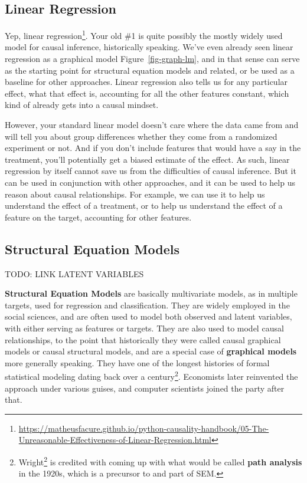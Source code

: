 \documentclass[
  letterpaper,
]{krantz}
\DeclareRobustCommand{\href}[2]{#2\footnote{\url{#1}}}
\begin{document}
\subsection{Linear Regression}\label{linear-regression}

Yep,
\href{https://matheusfacure.github.io/python-causality-handbook/05-The-Unreasonable-Effectiveness-of-Linear-Regression.html}{linear
regression}. Your old \#1 is quite possibly the mostly widely used model
for causal inference, historically speaking. We've even already seen
linear regression as a graphical model Figure~\ref{fig-graph-lm}, and in
that sense can serve as the starting point for structural equation
models and related, or be used as a baseline for other approaches.
Linear regression also tells us for any particular effect, what that
effect is, accounting for all the other features constant, which kind of
already gets into a causal mindset.

However, your standard linear model doesn't care where the data came
from and will tell you about group differences whether they come from a
randomized experiment or not. And if you don't include features that
would have a say in the treatment, you'll potentially get a biased
estimate of the effect. As such, linear regression by itself cannot save
us from the difficulties of causal inference. But it can be used in
conjunction with other approaches, and it can be used to help us reason
about causal relationships. For example, we can use it to help us
understand the effect of a treatment, or to help us understand the
effect of a feature on the target, accounting for other features.

\subsection{Structural Equation
Models}\label{structural-equation-models}

TODO: LINK LATENT VARIABLES

\textbf{Structural Equation Models} are basically multivariate models,
as in multiple targets, used for regression and classification. They are
widely employed in the social sciences, and are often used to model both
observed and latent variables, with either serving as features or
targets. They are also used to model causal relationships, to the point
that historically they were called causal graphical models or causal
structural models, and are a special case of \textbf{graphical models}
more generally speaking. They have one of the longest histories of
formal statistical modeling dating back over a century\footnote{\href{https://en.wikipedia.org/wiki/Sewall_Wright}{Wright}
  is credited with coming up with what would be called \textbf{path
  analysis} in the 1920s, which is a precursor to and part of SEM.}.
Economists later reinvented the approach under various guises, and
computer scientists joined the party after that.
\end{document}

